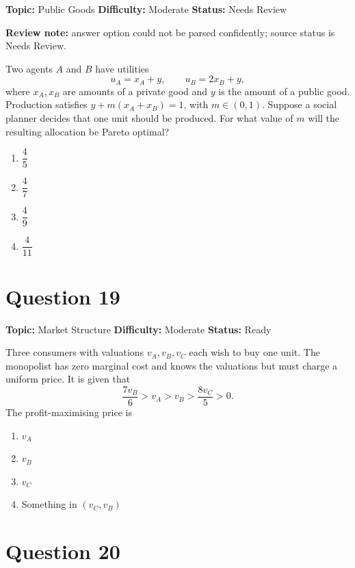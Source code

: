 \documentclass[11pt]{article}
\begin{document}

\noindent\textbf{Topic:} Public Goods \quad \textbf{Difficulty:} Moderate \quad \textbf{Status:} Needs Review

\par\noindent\textcolor{StatAmber}{\textbf{Review note:} answer option could not be parsed confidently; source status is Needs Review.}


Two agents $A$ and $B$ have utilities
\[
u_A = x_A + y, \qquad u_B = 2x_B + y,
\]
where $x_A, x_B$ are amounts of a private good and $y$ is the amount of a public
good. Production satisfies $y + m(x_A + x_B) = 1$, with $m \in (0,1)$. Suppose a
social planner decides that one unit should be produced. For what value of $m$
will the resulting allocation be Pareto optimal?
\begin{enumerate}[label=(\Alph*)]
\item $\dfrac{4}{5}$ \item $\dfrac{4}{7}$ \item $\dfrac{4}{9}$ \item $\dfrac{4}{11}$
\end{enumerate}

\newpage

\section*{Question 19}


\noindent\textbf{Topic:} Market Structure \quad \textbf{Difficulty:} Moderate \quad \textbf{Status:} Ready



Three consumers with valuations $v_A, v_B, v_C$ each wish to buy one unit. The
monopolist has zero marginal cost and knows the valuations but must charge a
uniform price. It is given that
\[
\frac{7 v_B}{6} > v_A > v_B > \frac{8 v_C}{5} > 0.
\]
The profit-maximising price is
\begin{enumerate}[label=(\Alph*)]
\item $v_A$ \item $v_B$ \item $v_C$ \item Something in $(v_C, v_B)$
\end{enumerate}

\newpage

\section*{Question 20}
\end{document}
